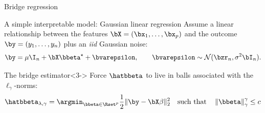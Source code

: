 \documentclass{beamer}\usepackage[]{graphicx}\usepackage[]{color}
\begin{document}
\begin{frame}{Bridge regression}
  
  \begin{block}{A simple interpretable model: Gaussian linear regression}
    Assume  a   linear  relationship  between  the   features  $\bX  =
    (\bx_1,\dots,\bx_p)$ and the outcome $\by = (y_1,\dots, y_n)$ plus
    an \emph{iid} Gaussian noise:
    \begin{displaymath}
      \by = \mu \I_n + \bX \bbeta^\star + \bvarepsilon, \qquad \bvarepsilon\sim\mathcal{N}(\bzr_n, \sigma^2\bI_n). 
    \end{displaymath}        

  \end{block}

  
  \begin{block}{The bridge estimator}<3-> Force $\hatbbeta$ to live in
    balls associated with the $\ell_\gamma$-norms:
    \begin{equation*}
      \hatbbeta_{\lambda,\gamma} = \argmin_{\bbeta\in\Rset^p}
      \frac{1}{2} \|\by - \bX \beta \|^2_2 \quad \text{such that} \quad \left\| \bbeta
      \right\|_\gamma^\gamma \leq c              
    \end{equation*}
  \end{block}

\end{frame}
\end{document}
